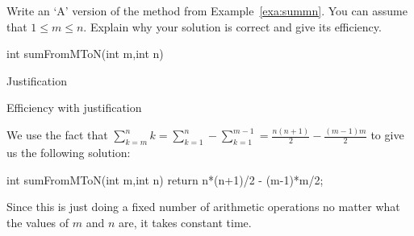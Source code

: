\begin{exer}
Write an `A' version of the method from Example~\ref{exa:summn}.
You can assume that $1\leq m\leq n$. 
Explain why your solution is correct and give its efficiency.
\begin{code}
	int sumFromMToN(int m,int n) {
	    
	    
	    
	    
	    
	    
	    
	    
	}
\end{code}

\noindent
Justification

\vspace*{1in}
\noindent
Efficiency with justification

\vspace*{1in}
\begin{answer}
We use the fact that 
${\displaystyle \sum_{k=m}^n k = \sum_{k=1}^n - \sum_{k=1}^{m-1}
=\frac{n(n+1)}{2} - \frac{(m-1)m}{2} }$ to give us the following solution:
\begin{code}
    int sumFromMToN(int m,int n) {
	    return n*(n+1)/2 - (m-1)*m/2;
	}
\end{code}
Since this is just doing a fixed number of arithmetic operations no matter
what the values of $m$ and $n$ are, it takes constant time.
\end{answer}
\end{exer}

